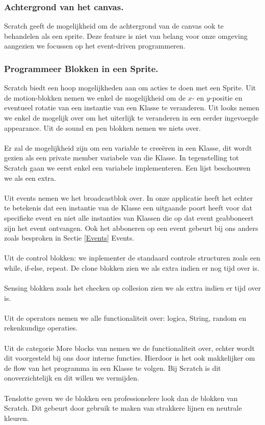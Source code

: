 \documentclass[]{article}
\begin{document}
\subsubsection{Achtergrond van het canvas.}
Scratch geeft de mogelijkheid om de achtergrond van de canvas ook te behandelen als een sprite. Deze feature is niet van belang voor onze omgeving aangezien we focussen op het event-driven programmeren.
\subsubsection{Programmeer Blokken in een Sprite.}
Scratch biedt een hoop mogelijkheden aan om acties te doen met een Sprite. Uit de motion-blokken nemen we enkel de mogelijkheid om de $x$- en $y$-positie en eventueel rotatie van een instantie van een Klasse te veranderen. Uit looks nemen we enkel de mogelijk over om het uiterlijk te veranderen in een eerder ingevoegde appearance. Uit de sound en pen blokken nemen we niets over.\\\\ Er zal de mogelijkheid zijn om een variable te cree\"{e}ren in een Klasse, dit wordt gezien als een private member variabele van die Klasse. In tegenstelling tot Scratch gaan we eerst enkel een variabele implementeren. Een lijst beschouwen we als een extra.\\\\ Uit events nemen we het broadcastblok over. In onze applicatie heeft het echter te betekenis dat een instantie van de Klasse een uitgaande poort heeft voor dat specifieke event en niet alle instanties van Klassen die op dat event geabboneert zijn het event ontvangen. Ook het abboneren op een event gebeurt bij ons anders zoals besproken in Sectie \ref{Events} Events.\\\\ Uit de control blokken: we inplementer de standaard controle structuren zoals een while, if-else, repeat. De clone blokken zien we als extra indien er nog tijd over is.
\\\\Sensing blokken zoals het checken op collesion zien we als extra indien er tijd over is.
\\\\ Uit de operators nemen we alle functionaliteit over: logica, String, random en rekenkundige operaties.
\\\\ Uit de categorie More blocks van nemen we de functionaliteit over, echter wordt dit voorgesteld bij ons door interne functies. Hierdoor is het ook makkelijker om de flow van het programma in een Klasse te volgen. Bij Scratch is dit onoverzichtelijk en dit willen we vermijden.\\\\
Tenslotte geven we de blokken een professionelere look dan de blokken van Scratch. Dit gebeurt door gebruik te maken van strakkere lijnen en neutrale kleuren.
 
\end{document}
